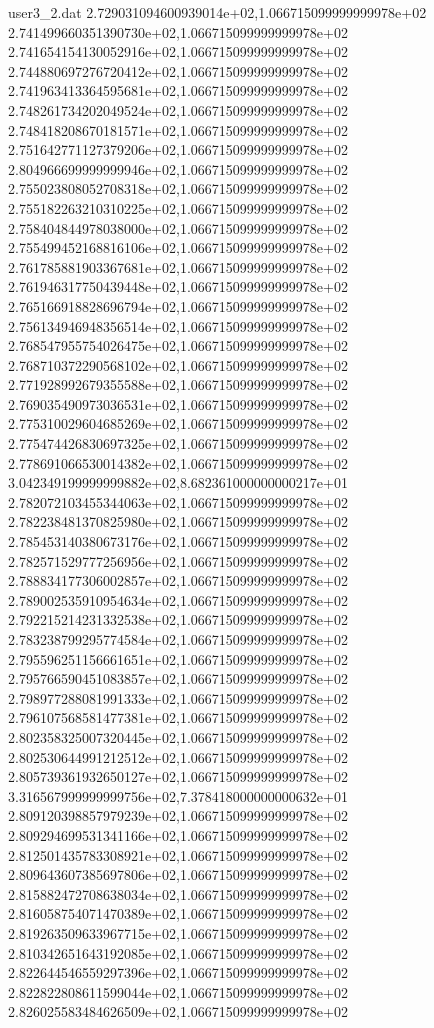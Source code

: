 \begin{filecontents}{user3_2.dat}
2.729031094600939014e+02,1.066715099999999978e+02
2.741499660351390730e+02,1.066715099999999978e+02
2.741654154130052916e+02,1.066715099999999978e+02
2.744880697276720412e+02,1.066715099999999978e+02
2.741963413364595681e+02,1.066715099999999978e+02
2.748261734202049524e+02,1.066715099999999978e+02
2.748418208670181571e+02,1.066715099999999978e+02
2.751642771127379206e+02,1.066715099999999978e+02
2.804966699999999946e+02,1.066715099999999978e+02
2.755023808052708318e+02,1.066715099999999978e+02
2.755182263210310225e+02,1.066715099999999978e+02
2.758404844978038000e+02,1.066715099999999978e+02
2.755499452168816106e+02,1.066715099999999978e+02
2.761785881903367681e+02,1.066715099999999978e+02
2.761946317750439448e+02,1.066715099999999978e+02
2.765166918828696794e+02,1.066715099999999978e+02
2.756134946948356514e+02,1.066715099999999978e+02
2.768547955754026475e+02,1.066715099999999978e+02
2.768710372290568102e+02,1.066715099999999978e+02
2.771928992679355588e+02,1.066715099999999978e+02
2.769035490973036531e+02,1.066715099999999978e+02
2.775310029604685269e+02,1.066715099999999978e+02
2.775474426830697325e+02,1.066715099999999978e+02
2.778691066530014382e+02,1.066715099999999978e+02
3.042349199999999882e+02,8.682361000000000217e+01
2.782072103455344063e+02,1.066715099999999978e+02
2.782238481370825980e+02,1.066715099999999978e+02
2.785453140380673176e+02,1.066715099999999978e+02
2.782571529777256956e+02,1.066715099999999978e+02
2.788834177306002857e+02,1.066715099999999978e+02
2.789002535910954634e+02,1.066715099999999978e+02
2.792215214231332538e+02,1.066715099999999978e+02
2.783238799295774584e+02,1.066715099999999978e+02
2.795596251156661651e+02,1.066715099999999978e+02
2.795766590451083857e+02,1.066715099999999978e+02
2.798977288081991333e+02,1.066715099999999978e+02
2.796107568581477381e+02,1.066715099999999978e+02
2.802358325007320445e+02,1.066715099999999978e+02
2.802530644991212512e+02,1.066715099999999978e+02
2.805739361932650127e+02,1.066715099999999978e+02
3.316567999999999756e+02,7.378418000000000632e+01
2.809120398857979239e+02,1.066715099999999978e+02
2.809294699531341166e+02,1.066715099999999978e+02
2.812501435783308921e+02,1.066715099999999978e+02
2.809643607385697806e+02,1.066715099999999978e+02
2.815882472708638034e+02,1.066715099999999978e+02
2.816058754071470389e+02,1.066715099999999978e+02
2.819263509633967715e+02,1.066715099999999978e+02
2.810342651643192085e+02,1.066715099999999978e+02
2.822644546559297396e+02,1.066715099999999978e+02
2.822822808611599044e+02,1.066715099999999978e+02
2.826025583484626509e+02,1.066715099999999978e+02

\end{filecontents}
